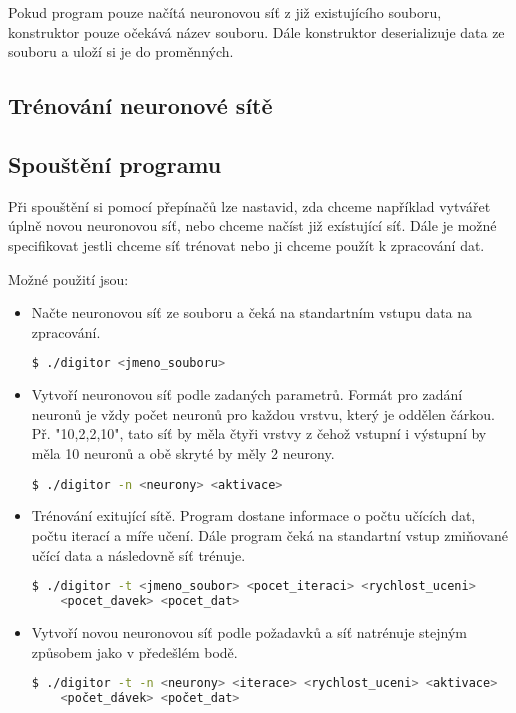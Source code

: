 Pokud program pouze načítá neuronovou síť z již existujícího souboru, konstruktor pouze očekává název souboru.
Dále konstruktor deserializuje data ze souboru a uloží si je do proměnných.

\subsection{Trénování neuronové sítě}

\subsection{Spouštění programu}
Při spouštění si pomocí přepínačů lze nastavid, zda chceme například vytvářet úplně novou neuronovou síť, nebo chceme načíst již exístující síť.
Dále je možné specifikovat jestli chceme síť trénovat nebo ji chceme použít k zpracování dat.

Možné použití jsou:
\begin{itemize}
    \item Načte neuronovou síť ze souboru a čeká na standartním vstupu data na zpracování.
    \begin{lstlisting}[language=bash]
$ ./digitor <jmeno_souboru>
    \end{lstlisting}

    \item Vytvoří neuronovou síť podle zadaných parametrů.
    Formát pro zadání neuronů je vždy počet neuronů pro každou vrstvu, který je oddělen čárkou.
    Př. "10,2,2,10", tato síť by měla čtyři vrstvy z čehož vstupní i výstupní by měla 10 neuronů a obě skryté by měly 2 neurony.
    \begin{lstlisting}[language=bash]
$ ./digitor -n <neurony> <aktivace>
    \end{lstlisting}

    \item Trénování exitující sítě. Program dostane informace o počtu učících dat, počtu iterací a míře učení.
    Dále program čeká na standartní vstup zmiňované učící data a následovně síť trénuje.
    \begin{lstlisting}[language=bash]
$ ./digitor -t <jmeno_soubor> <pocet_iteraci> <rychlost_uceni>
    <pocet_davek> <pocet_dat>
    \end{lstlisting}

    \item Vytvoří novou neuronovou síť podle požadavků a síť natrénuje stejným způsobem jako v předešlém bodě.
    \begin{lstlisting}[language=bash]
$ ./digitor -t -n <neurony> <iterace> <rychlost_uceni> <aktivace>
    <počet_dávek> <počet_dat>
    \end{lstlisting}
\end{itemize}
